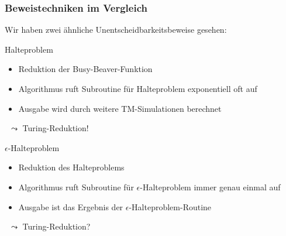 \documentclass[aspectratio=1610,onlymath]{beamer}
\begin{document}
\begin{frame}\frametitle{Beweistechniken im Vergleich}

Wir haben zwei ähnliche Unentscheidbarkeitsbeweise gesehen:\bigskip

\begin{minipage}{5cm}
\alert{Halteproblem}
\begin{itemize}
\item Reduktion der Busy-Beaver-Funktion
\item Algorithmus ruft Subroutine für Halteproblem exponentiell oft auf
\item Ausgabe wird durch weitere TM-Simulationen berechnet
\end{itemize}\bigskip
~\hspace{5mm}$\leadsto$ Turing-Reduktion!
\end{minipage}%
\begin{minipage}{5cm}
\alert{$\epsilon$-Halteproblem}
\begin{itemize}
\item Reduktion des Halteproblems
\item Algorithmus ruft Subroutine für $\epsilon$-Halteproblem immer genau einmal auf
\item Ausgabe ist das Ergebnis der $\epsilon$-Halteproblem-Routine
\end{itemize}\bigskip
~\hspace{5mm}$\leadsto$ Turing-Reduktion?
\end{minipage}

\end{frame}
\end{document}
